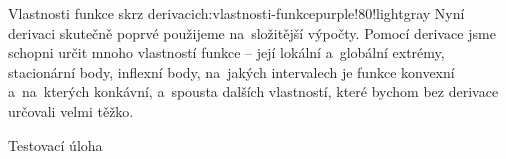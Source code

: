 \begin{chapterintro}{Vlastnosti funkce skrz derivaci}{ch:vlastnosti-funkce}{purple!80!lightgray}{}
    Nyní derivaci skutečně poprvé použijeme na~složitější výpočty. Pomocí derivace
    jsme schopni určit mnoho vlastností funkce -- její lokální a~globální extrémy,
    stacionární body, inflexní body, na~jakých intervalech je funkce konvexní
    a~na~kterých konkávní, a~spousta dalších vlastností, které bychom bez derivace
    určovali velmi těžko.
\end{chapterintro}

\begin{exercise}
    Testovací úloha
\end{exercise}

